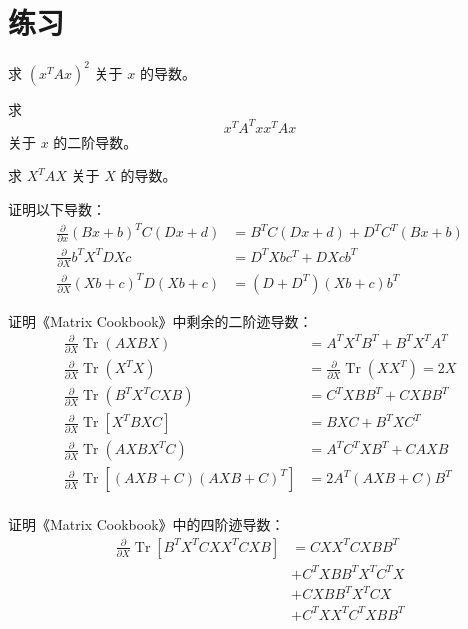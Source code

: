\section{练习}
\begin{exercise}
   求 \((x^T A x)^2\) 关于 $x$ 的导数。
\end{exercise}

\begin{exercise}
   求
   \[
      x^T A^T x x^T A x
   \]
   关于 $x$ 的二阶导数。
\end{exercise}

\begin{exercise}
   求 \(X^T A X\) 关于 $X$ 的导数。
\end{exercise}

\begin{exercise}
   证明以下导数：
   \begin{align*}
   \tag{78}
   \frac{\partial}{\partial x} (Bx+b)^T C (Dx+d)
   &= B^TC(Dx+d) + D^TC^T(Bx+b)
   \\
   \tag{82}
   \frac{\partial}{\partial X} b^T X^T D X c
   &= D^T X b c^T + DXcb^T
   \\
   \tag{83}
   \frac{\partial}{\partial X} (Xb+c)^T D (Xb+c)
   &= (D+D^T)(Xb+c)b^T
   \end{align*}
\end{exercise}

\begin{exercise}
   证明《Matrix Cookbook》中剩余的二阶迹导数：
   \begin{align*}
      \tag{114}
   \frac{\partial}{\partial X} \operatorname{Tr}(A X B X)
   &=A^T X^T B^T+B^T X^T A^T
   \\
   \tag{115}
   \frac{\partial}{\partial X} \operatorname{Tr}\left(X^T X\right)
   &=\frac{\partial}{\partial X} \operatorname{Tr}\left(X X^T\right)=2 X
   \\
   \tag{116}
   \frac{\partial}{\partial X} \operatorname{Tr}\left(B^T X^T C X B\right)
   &=C^T X B B^T+C X B B^T
   \\
   \tag{117}
   \frac{\partial}{\partial X} \operatorname{Tr}\left[X^T B X C\right]
   &=B X C+B^T X C^T
   \\
   \tag{118}
   \frac{\partial}{\partial X} \operatorname{Tr}\left(A X B X^T C\right)
   &=A^T C^T X B^T+C A X B
   \\
   \tag{119}
   \frac{\partial}{\partial X} \operatorname{Tr}\left[(A X B+C)(A X B+C)^T\right]
   &=2 A^T(A X B+C) B^T
   \\
   \end{align*}
\end{exercise}

\begin{exercise}
   证明《Matrix Cookbook》中的四阶迹导数：
   \begin{align*}
      \tag{123}
\frac{\partial}{\partial X} \operatorname{Tr}\left[B^T X^T C X X^T C X B\right]
&= C X X^T C X B B^T 
\\&+ C^T X B B^T X^T C^T X 
\\&+ C X B B^T X^T C X 
\\&+ C^T X X^T C^T X B B^T
   \end{align*}
\end{exercise}
